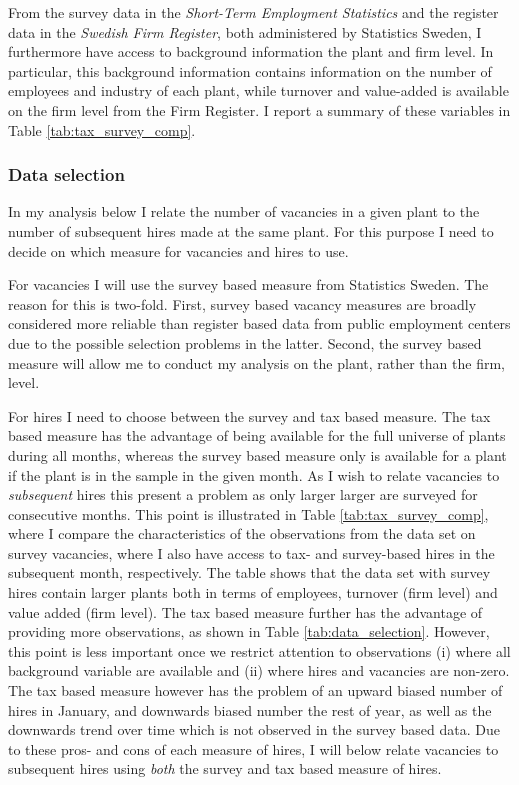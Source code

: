 From the survey data in the \emph{Short-Term Employment Statistics} and the register data in the \emph{Swedish Firm Register}, both administered by Statistics Sweden, I furthermore have access to background information the plant and firm level. In particular, this background information contains information on the number of employees and industry of each plant, while turnover and value-added is available on the firm level from the Firm Register.  I report a summary of these variables in Table \ref{tab:tax_survey_comp}.

\subsubsection{Data selection}
\label{sec:data:selection}
In my analysis below I relate the number of vacancies in a given plant to the number of subsequent hires made at the same plant. For this purpose I need to decide on which measure for vacancies and hires to use. 

For vacancies I will use the survey based measure from Statistics Sweden. The reason for this is two-fold. First, survey based vacancy measures are broadly considered more reliable than register based data from public employment centers due to the possible selection problems in the latter. Second, the survey based measure will allow me to conduct my analysis on the plant, rather than the firm, level. %

For hires I need to choose between the survey and tax based measure. The tax based measure has the advantage of being available for the full universe of plants during all months, whereas the survey based measure only is available for a plant if the plant is in the sample in the given month. As I wish to relate vacancies to \emph{subsequent} hires this present a problem as only larger larger are surveyed for consecutive months. This point is illustrated in Table \ref{tab:tax_survey_comp}, where I compare the characteristics of the observations from the data set on survey vacancies, where I also have access to tax- and survey-based hires in the subsequent month, respectively. The table shows that the data set with survey hires contain larger plants both in terms of employees, turnover (firm level) and value added (firm level). The tax based measure further has the advantage of providing more observations, as shown in Table \ref{tab:data_selection}. However, this point is less important once we restrict attention to observations (i) where all background variable are available and (ii) where hires and vacancies are non-zero. The tax based measure however has the problem of an upward biased number of hires in January, and downwards biased number the rest of year, as well as the downwards trend over time which is not observed in the survey based data. Due to these pros- and cons of each measure of hires, I will below relate vacancies to subsequent hires using \emph{both} the survey and tax based measure of hires.

